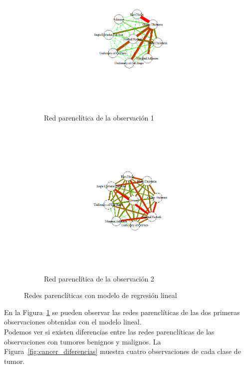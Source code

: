 \begin{figure}[htbp!]
	\begin{center}
		\begin{subfigure}[t]{\textwidth}
			\centering
			\includegraphics[height=7.5cm]{imagenes/cancer/1.png}
			\caption{Red parenclítica de la observación 1}
		\end{subfigure}
		\begin{subfigure}[t]{\textwidth}
			\centering
			\includegraphics[height=7.5cm]{imagenes/cancer/2.png}
			\caption{Red parenclítica de la observación 2}
		\end{subfigure}
		
	\end{center}
	\caption{Redes parenclíticas con modelo de regresión lineal}
	\label{fig:cancer_par}
\end{figure}
 
En la Figura~\ref{fig:cancer_par} se pueden observar las redes parenclíticas de las dos primeras observaciones obtenidas con el modelo lineal.\\

Podemos ver si existen diferencias entre las redes parenclíticas de las observaciones con tumores benignos y malignos. La Figura~\ref{fig:cancer_diferencias} muestra cuatro observaciones de cada clase de tumor.\\

